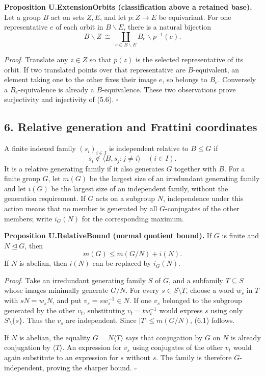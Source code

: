 \documentclass[
  11pt,
  a4paper,
]{article}
\begin{document}
\textbf{Proposition U.ExtensionOrbits (classification above a retained
base).} Let a group \(B\) act on sets \(Z,E\), and let \(p:Z\to E\) be
equivariant. For one representative \(e\) of each orbit in
\(B\backslash E\), there is a natural bijection \[
B\backslash Z\ \cong\ \coprod_{e\in B\backslash E}B_e\backslash p^{-1}(e).
\tag{5.6}
\]

\emph{Proof.} Translate any \(z\in Z\) so that \(p(z)\) is the selected
representative of its orbit. If two translated points over that
representative are \(B\)-equivalent, an element taking one to the other
fixes their image \(e\), so belongs to \(B_e\). Conversely a
\(B_e\)-equivalence is already a \(B\)-equivalence. These two
observations prove surjectivity and injectivity of (5.6). \(\square\)

\subsection{6. Relative generation and Frattini
coordinates}\label{relative-generation-and-frattini-coordinates}

A finite indexed family \((s_i)_{i\in I}\) is independent relative to
\(B\leq G\) if \[
s_i\notin\langle B,s_j:j\ne i\rangle\quad(i\in I).
\] It is a relative generating family if it also generates \(G\)
together with \(B\). For a finite group \(G\), let \(m(G)\) be the
largest size of an irredundant generating family and let \(i(G)\) be the
largest size of an independent family, without the generation
requirement. If \(G\) acts on a subgroup \(N\), independence under this
action means that no member is generated by all \(G\)-conjugates of the
other members; write \(i_G(N)\) for the corresponding maximum.

\textbf{Proposition U.RelativeBound (normal quotient bound).} If \(G\)
is finite and \(N\unlhd G\), then \[
m(G)\leq m(G/N)+i(N).
\tag{6.1}
\] If \(N\) is abelian, then \(i(N)\) can be replaced by \(i_G(N)\).

\emph{Proof.} Take an irredundant generating family \(S\) of \(G\), and
a subfamily \(T\subseteq S\) whose images minimally generate \(G/N\).
For every \(s\in S\setminus T\), choose a word \(w_s\) in \(T\) with
\(sN=w_sN\), and put \(v_s=sw_s^{-1}\in N\). If one \(v_s\) belonged to
the subgroup generated by the other \(v_t\), substituting
\(v_t=tw_t^{-1}\) would express \(s\) using only \(S\setminus\{s\}\).
Thus the \(v_s\) are independent. Since \(|T|\leq m(G/N)\), (6.1)
follows.

If \(N\) is abelian, the equality \(G=N\langle T\rangle\) says that
conjugation by \(G\) on \(N\) is already conjugation by
\(\langle T\rangle\). An expression for \(v_s\) using conjugates of the
other \(v_t\) would again substitute to an expression for \(s\) without
\(s\). The family is therefore \(G\)-independent, proving the sharper
bound. \(\square\)
\end{document}
